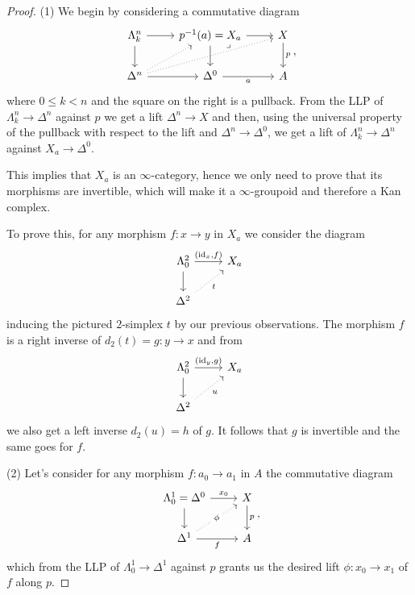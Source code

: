 \documentclass[a4paper,11pt,openany]{scrartcl}
\begin{document}
~\\
\begin{proof}
    (1) We begin by considering a commutative diagram
    \[\begin{tikzcd}
        {\Lambda^n_k} & {p^{-1}(a)=X_a} & X \\
        {\Delta^n} & {\Delta^0} & A
        \arrow["p", from=1-3, to=2-3]
        \arrow["a"', from=2-2, to=2-3]
        \arrow[from=1-2, to=1-3]
        \arrow[from=1-2, to=2-2]
        \arrow[from=2-1, to=2-2]
        \arrow[from=1-1, to=2-1]
        \arrow[from=1-1, to=1-2]
        \arrow[dotted, from=2-1, to=1-3]
        \arrow[dotted, from=2-1, to=1-2]
        \arrow["\lrcorner"{anchor=center, pos=0.01}, draw=none, from=1-2, to=2-3]
    \end{tikzcd},\]
    where $0\leq k<n$ and the square on the right is a pullback. From the LLP of
    $\Lambda^n_k\rightarrow\Delta^n$ against $p$ we get a lift
    $\Delta^n\rightarrow X$ and then, using the universal property of the
    pullback with respect to the lift and $\Delta^n\rightarrow\Delta^0$, we get
    a lift of $\Lambda^n_k\rightarrow\Delta^n$ against $X_a\rightarrow\Delta^0$.

    This implies that $X_a$ is an $\infty$-category, hence we only need to prove
    that its morphisms are invertible, which will make it a $\infty$-groupoid
    and therefore a Kan complex.

    To prove this, for any morphism $f\colon x\rightarrow y$ in $X_a$ we
    consider the diagram
    \[\begin{tikzcd}
        {\Lambda^2_0} & {X_a} \\
        {\Delta^2}
        \arrow["{(\id_x,f)}", from=1-1, to=1-2]
        \arrow[from=1-1, to=2-1]
        \arrow["t"', dotted, from=2-1, to=1-2]
    \end{tikzcd}\]
    inducing the pictured 2-simplex $t$ by our previous observations. The
    morphism $f$ is a right inverse of $d_2(t)=g\colon y\rightarrow x$ and from
    \[\begin{tikzcd}
        {\Lambda^2_0} & {X_a} \\
        {\Delta^2}
        \arrow["{(\id_y,g)}", from=1-1, to=1-2]
        \arrow[from=1-1, to=2-1]
        \arrow["u"', dotted, from=2-1, to=1-2]
    \end{tikzcd}\]
    we also get a left inverse $d_2(u)=h$ of $g$. It follows that $g$ is
    invertible and the same goes for $f$.

    (2) Let's consider for any morphism $f\colon a_0\rightarrow a_1$ in $A$ the
    commutative diagram
    \[\begin{tikzcd}
        {\Lambda^1_0=\Delta^0} & X \\
        {\Delta^1} & A
        \arrow["p", from=1-2, to=2-2]
        \arrow["f"', from=2-1, to=2-2]
        \arrow["{x_0}", from=1-1, to=1-2]
        \arrow[from=1-1, to=2-1]
        \arrow["{\phi}"{description}, dotted, from=2-1, to=1-2]
    \end{tikzcd},\]
    which from the LLP of $\Lambda^1_0\rightarrow\Delta^1$ against $p$ grants us
    the desired lift $\phi\colon x_0\rightarrow x_1$ of $f$ along $p$.


\end{proof}
\end{document}
